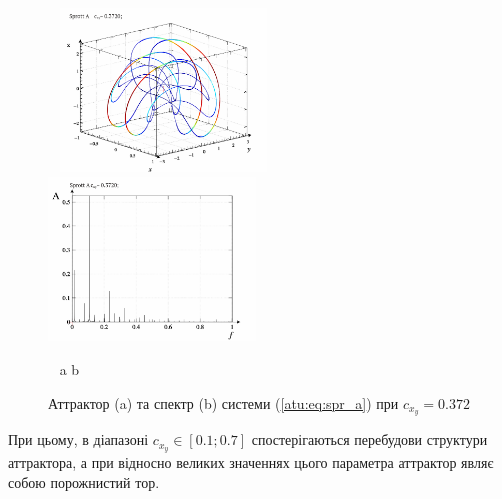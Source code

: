 \begin{figure}[htb!]
\centerline{
  ~ \hfill
  \includegraphics[width=0.49\textwidth]{p/cha/spr_a/sprott_a-p_xyz_cx_y=0x372.png}
  \hfill
  \includegraphics[width=0.49\textwidth]{p/cha/spr_a/sprott_a_f-p_f_cx_y=0x372.png}
  \hfill ~
}
\vspace{-1.5ex}
\begin{center}
  ~ \hfill a \hfill\hfill b \hfill ~
\end{center}
\vspace{-2.5ex}
\caption{Аттрактор (a) та спектр (b) системи (\ref{atu:eq:spr_a}) при $c_{x_y} =0.372$}
\label{atu:f:spr_a_p_0372}
\end{figure}

При цьому, в діапазоні
$ c_{x_y} \in [0.1; 0.7] $ спостерігаються перебудови структури аттрактора,
а при відносно великих значеннях цього параметра аттрактор
являє собою порожнистий тор.

